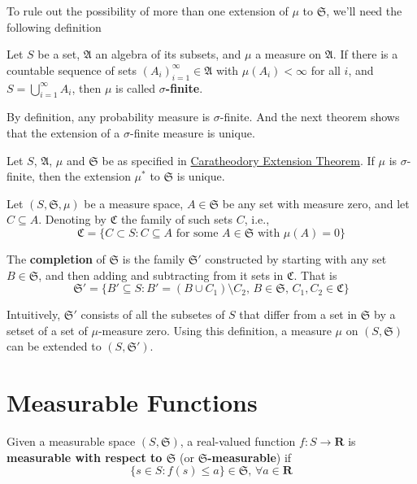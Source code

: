 To rule out the possibility of more than one extension of $\mu$ to $\mathfrak{S}$, we'll need the following definition

\begin{definition}
	Let $S$ be a set, $\mathfrak{A}$ an algebra of its subsets, and $\mu$ a measure on $\mathfrak{A}$. If there is a countable sequence of sets $(A_i)_{i=1}^\infty \in \mathfrak{A}$ with $\mu(A_i) < \infty$ for all $i$, and $S = \bigcup_{i=1}^\infty A_i$, then $\mu$ is called \textbf{$\sigma$-finite}.
\end{definition}

By definition, any probability measure is $\sigma$-finite. And the next theorem shows that the extension of a $\sigma$-finite measure is unique.

\begin{theorem}
	Let $S$, $\mathfrak{A}$, $\mu$ and $\mathfrak{S}$ be as specified in \hyperref[thm:caratheodory]{Caratheodory Extension Theorem}. If $\mu$ is $\sigma$-finite, then the extension $\mu^{\ast}$ to $\mathfrak{S}$ is unique.
\end{theorem}

\begin{definition}
	Let $(S, \mathfrak{S}, \mu)$ be a measure space, $A \in \mathfrak{S}$ be any set with measure zero, and let $C \subseteq A$. Denoting by $\mathfrak{C}$ the family of such sets $C$, i.e.,
	\[
		\mathfrak{C} = \{ C \subset S : C \subseteq A \text{ for some } A \in \mathfrak{S} \text{ with } \mu(A) = 0 \}
	\]

	The \textbf{completion} of $\mathfrak{S}$ is the family $\mathfrak{S}'$ constructed by starting with any set $B \in \mathfrak{S}$, and then adding and subtracting from it sets in $\mathfrak{C}$. That is 
	\[
		\mathfrak{S}' = \{ B' \subseteq S : B' = (B \cup C_1) \setminus C_2, \, B \in \mathfrak{S}, \, C_1, C_2 \in \mathfrak{C} \} 
	\]
\end{definition}

Intuitively, $\mathfrak{S}'$ consists of all the subsetes of $S$ that differ from a set in $\mathfrak{S}$ by a setset of a set of $\mu$-measure zero. Using this definition, a measure $\mu$ on $(S, \mathfrak{S})$ can be extended to $(S, \mathfrak{S}')$.

\section{Measurable Functions}

\begin{definition}
	Given a measurable space $(S, \mathfrak{S})$, a real-valued function $f : S \longrightarrow \textbf{R}$ is \textbf{measurable with respect to $\mathfrak{S}$} (or \textbf{$\mathfrak{S}$-measurable}) if 
	\[
		\{ s \in S : f(s) \leq a \} \in \mathfrak{S}, \, \forall a \in \textbf{R}
	\]
\end{definition}

